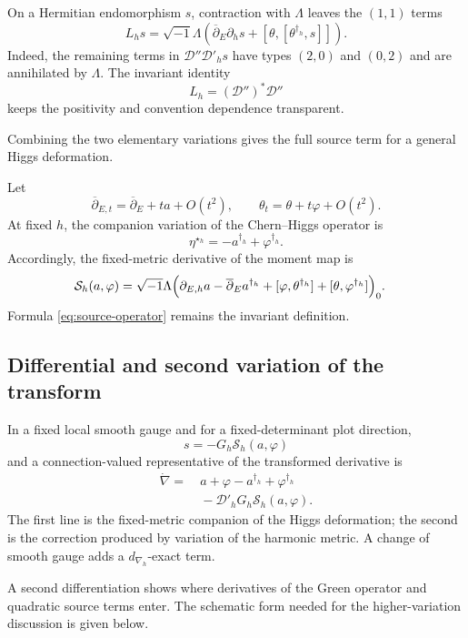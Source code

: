 \documentclass[11pt,reqno]{amsart}
\theoremstyle{definition}
\theoremstyle{remark}
\newcommand{\cD}{\mathcal D}
\newcommand{\cS}{\mathcal S}
\newcommand{\ddbar}{\overline\partial}
\begin{document}
On a Hermitian endomorphism $s$, contraction with $\Lambda$ leaves the $(1,1)$ terms
\begin{equation}\label{eq:expanded-Jacobi}
  L_hs
  =\sqrt{-1}\Lambda\left(
  \ddbar_E\partial_hs
  +[\theta,[\theta^{\dagger_h},s]]
  \right).
\end{equation}
Indeed, the remaining terms in $\cD''\cD'_hs$ have types $(2,0)$ and $(0,2)$ and are annihilated by $\Lambda$.  The invariant identity
\[
  L_h=(\cD'')^*\cD''
\]
keeps the positivity and convention dependence transparent.


Combining the two elementary variations gives the full source term for a general Higgs deformation.


Let
\[
  \ddbar_{E,t}=\ddbar_E+ta+O(t^2),
  \qquad
  \theta_t=\theta+t\varphi+O(t^2).
\]
At fixed $h$, the companion variation of the Chern--Higgs operator is
\[
  \eta^{\star_h}=-a^{\dagger_h}+\varphi^{\dagger_h}.
\]
Accordingly, the fixed-metric derivative of the moment map is
\begin{align}\label{eq:expanded-source-app}
  \cS_h(a,\varphi)
  =\sqrt{-1}\Lambda\Bigl(&
  \partial_{E,h}a-\ddbar_Ea^{\dagger_h}
  +[\varphi,\theta^{\dagger_h}]
  +[\theta,\varphi^{\dagger_h}]
  \Bigr)_0.
\end{align}
Formula \eqref{eq:source-operator} remains the invariant definition.

\subsection{Differential and second variation of the transform}

In a fixed local smooth gauge and for a fixed-determinant plot direction,
\[
  s=-G_h\cS_h(a,\varphi)
\]
and a connection-valued representative of the transformed derivative is
\begin{align}\label{eq:expanded-dNAH-app}
  \dot\nabla
  =&\ a+\varphi-a^{\dagger_h}+\varphi^{\dagger_h}
  \\
  &\ -\cD'_hG_h\cS_h(a,\varphi).
\end{align}
The first line is the fixed-metric companion of the Higgs deformation; the second is the correction produced by variation of the harmonic metric.  A change of smooth gauge adds a $d_{\nabla_h}$-exact term.


A second differentiation shows where derivatives of the Green operator and quadratic source terms enter.  The schematic form needed for the higher-variation discussion is given below.
\end{document}
